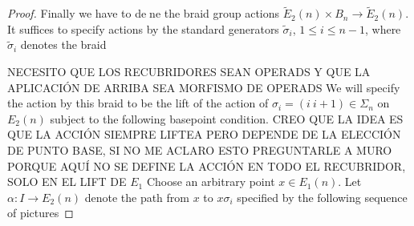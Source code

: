 \documentclass[TFM.tex]{subfiles}
\begin{document}
\begin{proof}
Finally we have to dene the braid group actions $\widetilde{E}_2(n)\times B_n\to\widetilde{E}_2(n)$. It suffices
to specify actions by the standard generators $\widetilde{\sigma}_i$, $1 \leq i \leq n - 1$, where $\widetilde{\sigma}_i$ denotes
the braid

\begin{figure}[h!]
\centering
{}
\end{figure}


NECESITO QUE LOS RECUBRIDORES SEAN OPERADS Y QUE LA APLICACIÓN DE ARRIBA SEA MORFISMO DE OPERADS
We will specify the action by this braid to be the lift of the action of $\sigma_i = (i\ i+1)\in\Sigma_n$ on $E_2(n)$ subject to the following basepoint condition. CREO QUE LA IDEA ES QUE LA ACCIÓN SIEMPRE LIFTEA PERO DEPENDE DE LA ELECCIÓN DE PUNTO BASE, SI NO ME ACLARO ESTO PREGUNTARLE A MURO PORQUE AQUÍ NO SE DEFINE LA ACCIÓN EN TODO EL RECUBRIDOR, SOLO EN EL LIFT DE $E_1$ Choose an arbitrary point $x\in E_1(n)$. Let $\alpha:I\to E_2(n)$ denote the path from $x$ to $x\sigma_i$ specified by the following sequence
of pictures


\end{proof}
\end{document}
